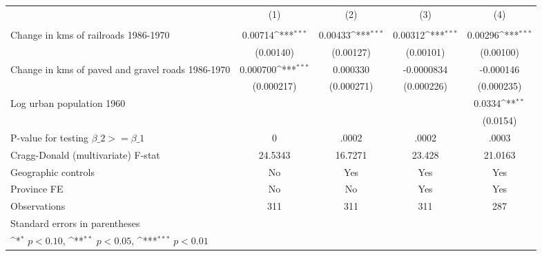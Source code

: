 {
\def\sym#1{\ifmmode^{#1}\else\(^{#1}\)\fi}
\begin{tabular}{l*{4}{c}}
\hline\hline
                &\multicolumn{1}{c}{(1)}&\multicolumn{1}{c}{(2)}&\multicolumn{1}{c}{(3)}&\multicolumn{1}{c}{(4)}\\
                &\multicolumn{1}{c}{}&\multicolumn{1}{c}{}&\multicolumn{1}{c}{}&\multicolumn{1}{c}{}\\
\hline
Change in kms of railroads 1986-1970&  0.00714\sym{***}&  0.00433\sym{***}&  0.00312\sym{***}&  0.00296\sym{***}\\
                &(0.00140)         &(0.00127)         &(0.00101)         &(0.00100)         \\
[1em]
Change in kms of paved and gravel roads 1986-1970& 0.000700\sym{***}& 0.000330         &-0.0000834         &-0.000146         \\
                &(0.000217)         &(0.000271)         &(0.000226)         &(0.000235)         \\
[1em]
Log urban population 1960&                  &                  &                  &   0.0334\sym{**} \\
                &                  &                  &                  & (0.0154)         \\
\hline
P-value for testing $\beta\_{2} >= \beta\_{1}$&        0         &    .0002         &    .0002         &    .0003         \\
Cragg-Donald (multivariate) F-stat&  24.5343         &  16.7271         &   23.428         &  21.0163         \\
Geographic controls&       No         &      Yes         &      Yes         &      Yes         \\
Province FE     &       No         &       No         &      Yes         &      Yes         \\
Observations    &      311         &      311         &      311         &      287         \\
\hline\hline
\multicolumn{5}{l}{\footnotesize Standard errors in parentheses}\\
\multicolumn{5}{l}{\footnotesize \sym{*} \(p<0.10\), \sym{**} \(p<0.05\), \sym{***} \(p<0.01\)}\\
\end{tabular}
}
